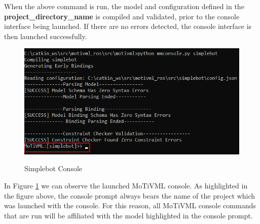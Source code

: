 \documentclass{article}
\begin{document}
When the above command is run, the model and configuration defined in the \textbf{project\_directory\_name} is compiled and validated, prior to the console interface being launched. If there are no errors detected, the console interface is then launched successfully. 

\begin{figure}[H]
	\caption{Simplebot Console}
	\centering
	\includegraphics[width=\columnwidth]{images/console.png}
	\label{consolelaunch}
\end{figure}

In Figure \ref{consolelaunch} we can observe the launched MoTiVML console. As highlighted in the figure above, the console prompt always bears the name of the project which was launched with the console. For this reason, all MoTiVML console commands that are run will be affiliated with the model highlighted in the console prompt.
\end{document}
